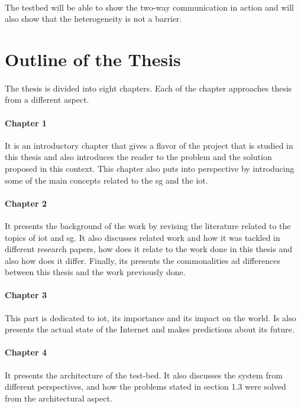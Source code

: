 \documentclass[oneside,12pt,a4paper,final]{book}
\begin{document}
\paragraph{}
The testbed will be able to show the two-way communication in action and will also show that the heterogeneity is not a barrier.

\section{Outline of the Thesis}
\paragraph{}
The thesis is divided into eight chapters. Each of the chapter approaches thesis from a different aspect. 
\paragraph{Chapter 1}
It is an introductory chapter that gives a flavor of the project that is  studied in this thesis and also introduces the reader to the problem and the solution proposed in this context. This chapter also puts into perspective by introducing some of the main concepts related to the \gls{sg} and the \gls{iot}. 
\paragraph{Chapter 2}
It presents the background of the work by revising the literature related to the topics of \gls{iot} and \gls{sg}. It also discusses related work and how it was tackled in different research papers, how does it relate to the work done in this thesis and also how does it differ. Finally, its presents the commonalities ad differences between this thesis and the work previously done.
\paragraph{Chapter 3}
This part is dedicated to \gls{iot}, its importance and its impact on the world. Is also presents the actual state of the Internet and makes predictions about its future.
\paragraph{Chapter 4}
It presents the architecture of the test-bed. It also discusses the system from different perspectives, and how the problems stated in section 1.3 were solved from the architectural aspect.
\end{document}
